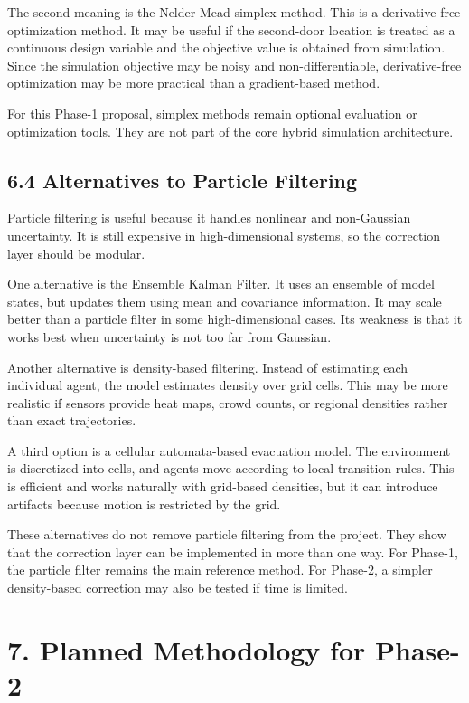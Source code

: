 \documentclass[
  11pt,
]{article}
\begin{document}
The second meaning is the Nelder-Mead simplex method. This is a
derivative-free optimization method. It may be useful if the second-door
location is treated as a continuous design variable and the objective
value is obtained from simulation. Since the simulation objective may be
noisy and non-differentiable, derivative-free optimization may be more
practical than a gradient-based method.

For this Phase-1 proposal, simplex methods remain optional evaluation or
optimization tools. They are not part of the core hybrid simulation
architecture.

\subsection{6.4 Alternatives to Particle
Filtering}\label{alternatives-to-particle-filtering}

Particle filtering is useful because it handles nonlinear and
non-Gaussian uncertainty. It is still expensive in high-dimensional
systems, so the correction layer should be modular.

One alternative is the Ensemble Kalman Filter. It uses an ensemble of
model states, but updates them using mean and covariance information. It
may scale better than a particle filter in some high-dimensional cases.
Its weakness is that it works best when uncertainty is not too far from
Gaussian.

Another alternative is density-based filtering. Instead of estimating
each individual agent, the model estimates density over grid cells. This
may be more realistic if sensors provide heat maps, crowd counts, or
regional densities rather than exact trajectories.

A third option is a cellular automata-based evacuation model. The
environment is discretized into cells, and agents move according to
local transition rules. This is efficient and works naturally with
grid-based densities, but it can introduce artifacts because motion is
restricted by the grid.

These alternatives do not remove particle filtering from the project.
They show that the correction layer can be implemented in more than one
way. For Phase-1, the particle filter remains the main reference method.
For Phase-2, a simpler density-based correction may also be tested if
time is limited.

\section{7. Planned Methodology for
Phase-2}\label{planned-methodology-for-phase-2}
\end{document}
